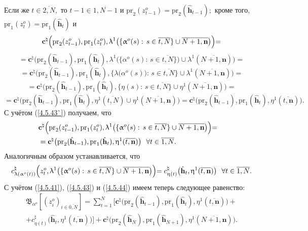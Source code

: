 \documentclass[12pt]{report}
\newcommand{\ov}{\overline}
\newcommand{\la}{\lambda}
\newcommand{\al}{\alpha}
\newcommand{\fa}{\forall}
\begin{document}
{{ Если же $t\in \ov{2,N},$ то $t-1\in \ov{1,N-1}$ и $\mathrm{pr}_2(z_{t-1}^o) =
\mathrm{pr}_2(\hat{\mathbf{h}}_{t-1});$ кроме того, $\mathrm{pr}_1(z_t^o) =
\mathrm{pr}_1(\hat{\mathbf{h}}_t)$ и
$$\mathbf{c}^\natural\Bigl(\mathrm{pr}_2(z_{t-1}^o),\mathrm{pr}_1(z_t^o),
\la^1\bigl(\{\al^o(s):\,s\in \ov{t,N}\}\cup \ov{N+1,\mathbf{n}}\bigl)\Bigl) =
$$
$$
= \mathbf{c}^\natural\bigl(\mathrm{pr}_2(\hat{\mathbf{h}}_{t-1}),
\mathrm{pr}_1(\hat{\mathbf{h}}_t),
\la^1\bigl(\{\al^o(s):\,s\in\ov{t,N}\}\bigl)\cup \la^1(\ov{N+1,\mathbf{n}})\bigl)=
$$
$$
= \mathbf{c}^\natural\bigl(\mathrm{pr}_2(\hat{\mathbf{h}}_{t-1}),
\mathrm{pr}_1(\hat{\mathbf{h}}_t),
\{\la\bigl(\al^o(s)\bigl):\,s\in\ov{t,N}\}\cup\la^1(\ov{N+1,\mathbf{n}})\bigl)=
$$
$$
=\mathbf{c}^\natural\bigl(\mathrm{pr}_2(\hat{\mathbf{h}}_{t-1}),
\mathrm{pr}_1(\hat{\mathbf{h}}_t),
\{\eta(s):\,s\in\ov{t,N}\}\cup \eta^1(\ov{N+1,\mathbf{n}})\bigl)=
$$
$$= \mathbf{c}^\natural\bigl(\mathrm{pr}_2(\hat{\mathbf{h}}_{t-1}),
\mathrm{pr}_1(\hat{\mathbf{h}}_t),
\eta^1(\ov{t,N})\cup \eta^1(\ov{N+1,\mathbf{n}})\bigl)=
\mathbf{c}^\natural\bigl(\mathrm{pr}_2(\hat{\mathbf{h}}_{t-1}),
\mathrm{pr}_1(\hat{\mathbf{h}}_t),
\eta^1(\ov{t,\mathbf{n}})\bigl).
$$
С учётом (\ref{4.5.43`}) получаем, что
\begin{eqnarray}
&\mathbf{c}^\natural\Bigl(\mathrm{pr}_2(z_{t-1}^o),\mathrm{pr}_1(z_t^o),
\la^1\bigl(\{\al^o(s):\,s\in \ov{t,N}\}
\cup \ov{N+1,\mathbf{n}}\bigl)\Bigl)=
&\nonumber\\
&= \mathbf{c}^\natural\bigl(\mathrm{pr}_2(\hat{\mathbf{h}}_{t-1}),
\mathrm{pr}_1(\hat{\mathbf{h}}_t),
\eta^1(\ov{t,\mathbf{n}})\bigl)\ \ \fa t\in \ov{1,N}.
&\label{4.5.44}
\end{eqnarray}
Аналогичным образом устанавливается, что
$$c_{\la(\al^o(t))}^\natural\Bigl(z_t^o,\la^1\bigl(\{\al^o(s):\,s\in
\ov{t,N}\} \cup \ov{N+1,\mathbf{n}}\bigl)\Bigl) =
c_{\eta(t)}^\natural\bigl(\hat{\mathbf{h}}_t,\eta^1(\ov{t,\mathbf{n}})\bigl) \ \
\fa t\in\ov{1,N}.
$$
С учётом (\ref{4.5.41}), (\ref{4.5.43}) и (\ref{4.5.44}) имеем теперь следующее равенство:
\begin{eqnarray}
&\mathfrak{B}_{\al^o}[(z_i^o)_{i\in\ov{0,N}}] =
\sum\limits_{t=1}^N\bigl[\mathbf{c}^\natural\bigl(\mathrm{pr}_2(\hat{\mathbf{h}}_{t-1}),
\mathrm{pr}_1(\hat{\mathbf{h}}_t),\eta^1(\ov{t,\mathbf{n}})\bigl) +
&\nonumber\\
&+c_{\eta(t)}^\natural\bigl(\hat{\mathbf{h}}_t,\eta^1(\ov{t,\mathbf{n}})\bigl)
\bigl] + \mathbf{c}^\natural\bigl(\mathrm{pr}_2(\hat{\mathbf{h}}_N),
\mathrm{pr}_1(\hat{\mathbf{h}}_{N+1}),
\eta^1(\ov{N+1,\mathbf{n}})\bigl).

\end{eqnarray}}}
\end{document}
